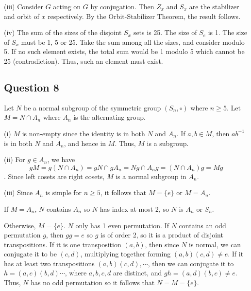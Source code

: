 \documentclass{article}
\begin{document}
(iii) Consider $G$ acting on $G$ by conjugation. Then $Z_x$ and $S_x$ are the stabilizer and orbit of $x$ respectively. By the Orbit-Stabilizer Theorem, the result follows.

(iv) The sum of the sizes of the disjoint $S_x$ sets is 25. The size of $S_e$ is 1. The size of $S_x$ must be 1, 5 or 25. Take the sum among all the sizes, and consider modulo 5. If no such element exists, the total sum would be 1 modulo 5 which cannot be 25 (contradiction). Thus, such an element must exist.

\subsection*{Question 8}
Let $N$ be a normal subgroup of the symmetric group $(S_n,\circ)$ where $n\geq5$. Let $M = N\cap A_n$ where $A_n$ is the alternating group.

(i) $M$ is non-empty since the identity is in both $N$ and $A_n$. If $a, b\in M$, then $ab^{-1}$ is in both $N$ and $A_n$, and hence in $M$. Thus, $M$ is a subgroup.

(ii) For $g\in A_n$, we have
\[gM = g(N\cap A_n) = gN\cap gA_n = Ng\cap A_ng = (N\cap A_n)g = Mg\].
Since left cosets are right cosets, $M$ is a normal subgroup in $A_n$.

(iii) Since $A_n$ is simple for $n\geq5$, it follows that $M = \{e\}$ or $M = A_n$. 

If $M=A_n$, $N$ contains $A_n$ so $N$ has index at most 2, so $N$ is $A_n$ or $S_n$. 

Otherwise, $M=\{e\}$. $N$ only has 1 even permutation. If $N$ contains an odd permutation $g$, then $gg=e$ so $g$ is of order 2, so it is a product of disjoint transpositions. If it is one transposition $(a,b)$, then since $N$ is normal, we can conjugate it to be $(c,d)$, multiplying together forming $(a,b)(c,d)\neq e$. If it has at least two transpositions $(a,b)(c,d), \cdots$, then we can conjugate it to $h = (a,c)(b,d)\cdots$, where $a,b,c,d$ are distinct, and $gh = (a,d)(b,c)\neq e$. Thus, $N$ has no odd permutation so it follows that $N=M=\{e\}$.
\end{document}
